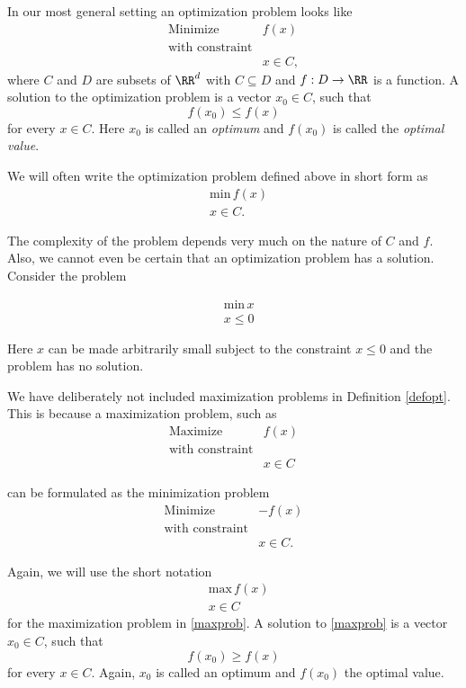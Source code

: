 \documentclass{article}
\begin{document}
\begin{definition}[emph]\label{defopt}
  In our most general setting an optimization problem looks like
\begin{align*}
  &\text{Minimize} &f(x)&\\
  &\text{with constraint}\\
  &&x\in C,
\end{align*}
     where $C$ and $D$ are subsets of $\RR^d$ with $C\subseteq D$ and $f: D\rightarrow \RR$ is a function.
A solution to the optimization problem is a vector $x_0\in C$, such that
$$
f(x_0) \leq f(x)
$$
for every $x\in C$. Here $x_0$ is called an \emph{optimum} and $f(x_0)$ is called the \emph{optimal value}.

We will often write the optimization problem defined above in short form as
\begin{align*}
  &\text{min}\, f(x)\\
  &x\in C.
\end{align*}
\end{definition}


  The complexity of the problem depends very much on the nature of $C$ and $f$. Also,
  we cannot even be certain that an optimization problem has a solution. Consider
  the problem

  \begin{align*}
    &\text{min}\,x\\
    &x\leq 0
  \end{align*}

  Here $x$ can be made arbitrarily small subject to the constraint $x\leq 0$ and
  the problem has no solution.





  \begin{remark}[emph]
    We have deliberately not included maximization problems in Definition \ref{defopt}. This is
because a maximization problem, such as
\begin{align}\label{maxprob}
  &\text{Maximize} &f(x)&\\
  &\text{with constraint}\\
  &&x\in C
\end{align}





 can be formulated as the minimization problem
\begin{align}
  &\text{Minimize} &-f(x)&\\
  &\text{with constraint}\\
  &&x\in C.
\end{align}




Again, we will use the short notation
\begin{align*}
  &\text{max}\,f(x)\\
  &x\in C
\end{align*}
for the maximization problem in \eqref{maxprob}.
A solution to \eqref{maxprob} is a vector $x_0\in C$, such that
$$
f(x_0) \geq f(x)
$$
for every $x\in C$. Again, $x_0$ is called an optimum and $f(x_0)$ the
optimal value.

\end{remark}
\end{document}
